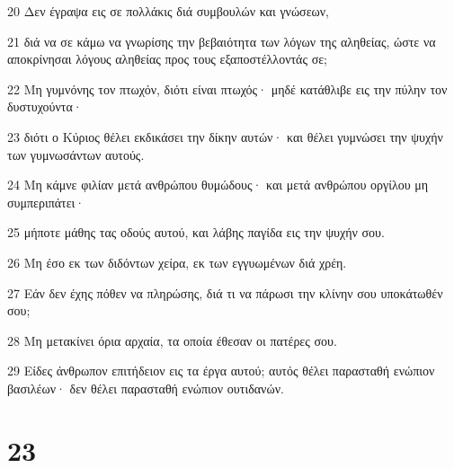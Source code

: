 \par 20 Δεν έγραψα εις σε πολλάκις διά συμβουλών και γνώσεων,
\par 21 διά να σε κάμω να γνωρίσης την βεβαιότητα των λόγων της αληθείας, ώστε να αποκρίνησαι λόγους αληθείας προς τους εξαποστέλλοντάς σε;
\par 22 Μη γυμνόνης τον πτωχόν, διότι είναι πτωχός· μηδέ κατάθλιβε εις την πύλην τον δυστυχούντα·
\par 23 διότι ο Κύριος θέλει εκδικάσει την δίκην αυτών· και θέλει γυμνώσει την ψυχήν των γυμνωσάντων αυτούς.
\par 24 Μη κάμνε φιλίαν μετά ανθρώπου θυμώδους· και μετά ανθρώπου οργίλου μη συμπεριπάτει·
\par 25 μήποτε μάθης τας οδούς αυτού, και λάβης παγίδα εις την ψυχήν σου.
\par 26 Μη έσο εκ των διδόντων χείρα, εκ των εγγυωμένων διά χρέη.
\par 27 Εάν δεν έχης πόθεν να πληρώσης, διά τι να πάρωσι την κλίνην σου υποκάτωθέν σου;
\par 28 Μη μετακίνει όρια αρχαία, τα οποία έθεσαν οι πατέρες σου.
\par 29 Είδες άνθρωπον επιτήδειον εις τα έργα αυτού; αυτός θέλει παρασταθή ενώπιον βασιλέων· δεν θέλει παρασταθή ενώπιον ουτιδανών.

\chapter{23}

